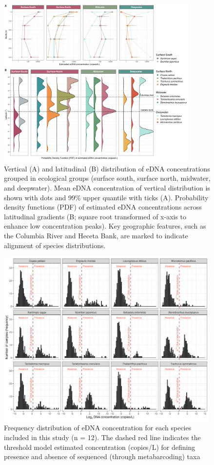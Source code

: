 \documentclass[9pt,twoside,lineno]{pnas-SI}
\begin{document}
\begin{figure}
\centering
\includegraphics[width=0.89\textwidth]{plots/4_Figure_4.jpg}
\caption{Vertical (A) and latitudinal (B) distribution of eDNA concentrations grouped in ecological groups (surface south, surface north, midwater, and deepwater). Mean eDNA concentration of vertical distribution is shown with dots and 99\% upper quantile with ticks (A). Probability density functions (PDF) of estimated eDNA concentrations across latitudinal gradients (B; square root transformed of x-axis to enhance low concentration peaks). Key geographic features, such as the Columbia River and Heceta Bank, are marked to indicate alignment of species distributions.}
\end{figure}

\begin{figure}
\centering
\includegraphics[width=0.99\textwidth]{plots/6_Supplementary_Figure_2.jpg}
\caption{Frequency distribution of eDNA concentration for each species included in this study (n = 12). The dashed red line indicates the threshold model estimated concentration (copies/L) for defining presence and absence of sequenced (through metabarcoding) taxa}
\end{figure}
\end{document}
